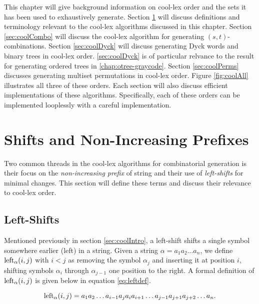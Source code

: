 This chapter will give background information on cool-lex order and the sets it has been used to exhaustively generate.  Section \ref{sec:shiftsandprefixes} will discuss definitions and terminology relevant to the cool-lex algorithms discussed in this chapter.  Section \ref{sec:coolCombo} will discuss the cool-lex algorithm for generating $(s,t)$-combinations.  Section \ref{sec:coolDyck} will discuss generating Dyck words and binary trees in cool-lex order.  \ref{sec:coolDyck} is of particular relvance to the result for generating ordered trees in \ref{chap:otree-graycode}.  Section \ref{sec:coolPerms} discusses generating multiset permutations in cool-lex order.  Figure \ref{fig:coolAll} illustrates all three of these orders. Each section will also discuss efficient implementations of these algorithms.  Specifically, each of these orders can be implemented looplessly with a careful implementation.


\section{Shifts and Non-Increasing Prefixes} \label{sec:shiftsandprefixes}
Two common threads in the cool-lex algorithms for combinatorial generation is their focus on the \emph{non-increasing prefix} of string and their use of \emph{left-shifts} for minimal changes.  This section will define these terms and discuss their relevance to cool-lex order.

\subsection{Left-Shifts}
  Mentioned previously in section \ref{sec:coolIntro}, a left-shift shifts a single symbol somewhere earlier (left) in a string.  Given a string $\alpha = a_1 a_2 \ldots a_n$, we define $\lshiftindex[\alpha]{i}{j}$ with $i < j$ as removing the symbol $\alpha_j$ and inserting it at position $i$, shifting symbols $\alpha_i$ through $\alpha_{j-1}$ one position to the right.  A formal definition of $\lshiftindex[\alpha]{i}{j}$ is given below in equation \eqref{eq:leftdef}.

\begin{equation} \label{eq:leftdef}
    \lshiftindex[\alpha]{i}{j} = a_1 a_2 \ldots a_{i-1} a_j a_{i} a_{i+1} \ldots a_{j-1} a_{j+1} a_{j+2} \ldots a_n.
\end{equation}



